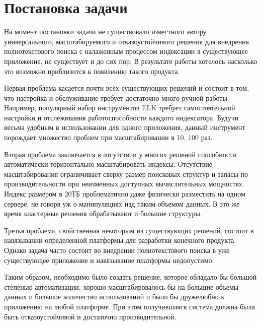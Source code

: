 \section{Постановка задачи}

На момент постановки задачи не существовало известного автору универсального, масштабируемого и отказоустойчивого решения для внедрения полнотекстового поиска с налаженным процессом индексации в существующее приложение, не существует и до сих пор. В результате работы хотелось насколько это возможно приблизится к появлению такого продукта.

Первая проблема касается почти всех существующих решений и состоит в том, что настройка и обслуживание требует достаточно много ручной работы. Например, популярный набор инструментов ELK требует самостоятельной настройки и отслеживания работоспособности каждого индексатора. Будучи весьма удобным в использовании для одного приложения, данный инструмент порождает множество проблем при масштабировании в 10, 100 раз.

Вторая проблема заключается в отсутствии у многих решений способности автоматически горизонтально масштабировать индексы. Отсутствие масштабирования ограничивает сверху размер поисковых структур и запасы по производительности при неизменных доступных вычислительных мощностях. Индекс размером в 20ТБ проблематично даже физически разместить на одном сервере, не говоря уж о манипуляциях над таким объемом данных. В это же время кластерные решения обрабатывают и большие структуры.

Третья проблема, свойственная некоторым из существующих решений, состоит в навязывании определенной платформы для разработки конечного продукта. Однако задача часто состоит во внедрении полнотекстового поиска в уже существующее приложение и навязывание платформы недопустимо.

Таким образом, необходимо было создать решение, которое обладало бы большой степенью автоматизации, хорошо масштабировалось бы на большие объемы данных и большое количество использований и было бы дружелюбно к приложению на любой платформе. При этом получившаяся система должна была быть отказоустойчивой и достаточно производительной.

\clearpage
